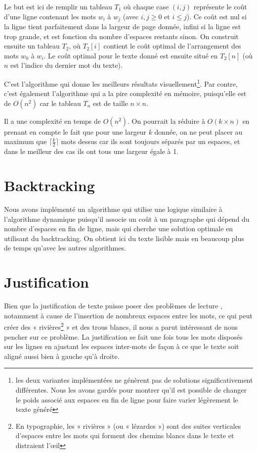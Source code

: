 \documentclass[a4paper, 11pt]{article}
\begin{document}
Le but est ici de remplir un tableau $T_1$ où chaque case $(i, j)$ représente le
coût d'une ligne contenant les mots $w_i$ à $w_j$ (avec $i,j\ge 0$ et $i\le j$).
Ce coût est nul si la ligne tient parfaitement dans la largeur de page donnée,
infini si la ligne est trop grande, et est fonction du nombre d'espaces restants
sinon. On construit ensuite un tableau $T_2$, où $T_2[i]$ contient le coût
optimal de l'arrangement des mots $w_0$ à $w_i$. Le coût optimal pour le texte
donné est ensuite situé en $T_2[n]$ (où $n$ est l'indice du dernier mot du
texte).

C'est l'algorithme qui donne les meilleurs résultats visuellement\footnote{les
deux variantes implémentées ne génèrent pas de solutions significativement
différentes. Nous les avons gardés pour montrer qu'il est possible de changer le
poids associé aux espaces en fin de ligne pour faire varier légèrement le texte
généré}. Par contre, c'est également l'algorithme qui a la pire complexité
en mémoire, puisqu'elle est de $O(n^2)$ car le tableau $T_n$ est de taille $n
\times n$.

Il a une complexité en temps de $O(n^2)$. On pourrait la réduire à $O(k\times
n)$ en prenant en compte le fait que pour une largeur $k$ donnée, on ne peut
placer au maximum que $\lceil \frac{k}{2} \rceil$ mots dessus car ils sont
toujours séparés par un espaces, et dans le meilleur des cas ils ont tous une
largeur égale à 1.

\section{Backtracking}

Nous avons implémenté un algorithme qui utilise une logique similaire à
l'algorithme dynamique puisqu'il associe un coût à un paragraphe qui dépend du
nombre d'espaces en fin de ligne, mais qui cherche une solution optimale en
utilisant du backtracking. On obtient ici du texte lisible mais en beaucoup plus
de temps qu'avec les autres algorithmes.


\section{Justification}
\label{sec:justification}

Bien que la justification de texte puisse poser des problèmes de lecture
\cite{Van96cognitive}, notamment à cause de l'insertion de nombreux espaces
entre les mots, ce qui peut créer des « rivières\footnote{En typographie, les
« rivières » (ou « lézardes ») sont des suites verticales d'espaces entre les
mots qui forment des chemins blancs dans le texte et distraient
l'œil\cite{Harkins12fr}} » et des trous blancs, il nous a parut intéressant de
nous pencher sur ce problème. La justification se fait une fois tous les mots
disposés sur les lignes en ajustant les espaces inter-mots de façon à ce que le
texte soit aligné aussi bien à gauche qu'à droite.
\end{document}

